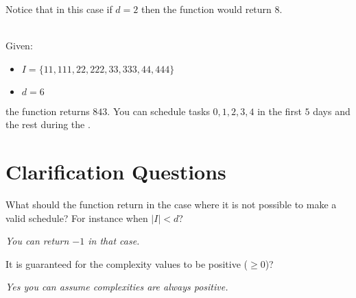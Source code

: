 \begin{exercise}
\begin{example}
        Notice that in this case if $d = 2$ then the function would return $8$.
    \end{example}

    \begin{example}
        \hfill \\
        Given:
        \begin{itemize}
            \item $I = \{11,111,22,222,33,333,44,444\}$
            \item $d = 6$
        \end{itemize}
        the function returns $843$. You can schedule tasks $0,1,2,3,4$ in the first $5$ days and the
        rest during the .
        
    \end{example}
\end{exercise}



\section{Clarification Questions}
        
    \begin{QandA}
        \item \begin{questionitem} \begin{question} What should the function return in the case where it is not possible to make a
            valid schedule? For instance when $|I| < d$?
        \end{question} 
        \begin{answered}
            \textit{You can return $-1$ in that case.}
        \end{answered} \end{questionitem}

        \item \begin{questionitem} \begin{question} It is guaranteed for the complexity values to be positive ($\geq 0$)?  \end{question}          
    \begin{answered}
            \textit{Yes you can assume complexities are always positive.}
        \end{answered} \end{questionitem}
    \end{QandA}

